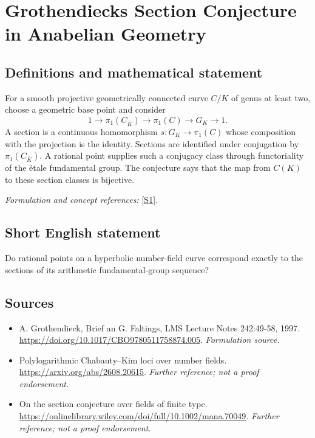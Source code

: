 \documentclass[11pt]{article}
\begin{document}
\section*{\texorpdfstring{Grothendiecks Section Conjecture in Anabelian Geometry}{Grothendiecks Section Conjecture in Anabelian Geometry}}\label{30006728}
\subsection{Definitions and mathematical statement}
For a smooth projective geometrically connected curve $C/K$ of genus at least two, choose a geometric base point and consider
\[
 1\longrightarrow\pi_1(C_{\bar K})\longrightarrow\pi_1(C)
 \longrightarrow G_K\longrightarrow1.
\]
A section is a continuous homomorphism $s:G_K\to\pi_1(C)$ whose composition with the projection is the identity. Sections are identified under conjugation by $\pi_1(C_{\bar K})$. A rational point supplies such a conjugacy class through functoriality of the étale fundamental group. The conjecture says that the map from $C(K)$ to these section classes is bijective.
\par\smallskip\textit{Formulation and concept references:} \href{https://doi.org/10.1017/CBO9780511758874.005}{[S1]}.

\subsection{Short English statement}
Do rational points on a hyperbolic number-field curve correspond exactly to the sections of its arithmetic fundamental-group sequence?
\subsection{Sources}
\begin{itemize}
\item[S1]A. Grothendieck, Brief an G. Faltings, LMS Lecture Notes 242:49-58, 1997.
\url{https://doi.org/10.1017/CBO9780511758874.005}.
\textit{Formulation source.}
\item[S2]Polylogarithmic Chabauty--Kim loci over number fields.
\url{https://arxiv.org/abs/2608.20615}.
\textit{Further reference; not a proof endorsement.}
\item[S3]On the section conjecture over fields of finite type.
\url{https://onlinelibrary.wiley.com/doi/full/10.1002/mana.70049}.
\textit{Further reference; not a proof endorsement.}
\end{itemize}
\end{document}
